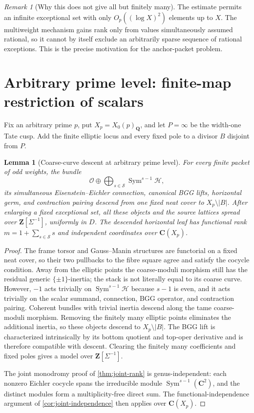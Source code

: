 \documentclass[11pt]{article}
\newtheorem{lemma}[lemma]{Lemma}
\theoremstyle{definition}
\theoremstyle{remark}
\newtheorem{remark}[remark]{Remark}
\newcommand{\Q}{\mathbf Q}
\newcommand{\Z}{\mathbf Z}
\newcommand{\C}{\mathbf C}
\newcommand{\Sym}{\operatorname{Sym}}
\newcommand{\calH}{\mathcal H}
\newcommand{\calO}{\mathcal O}
\begin{document}
\begin{remark}[Why this does not give all but finitely many]\label{rem:not-cofinite}
The estimate permits an infinite exceptional set with only
$O_p((\log X)^2)$ elements up to $X$.  The multiweight mechanism gains rank
only from values simultaneously assumed rational, so it cannot by itself
exclude an arbitrarily sparse sequence of rational exceptions.  This is the
precise motivation for the anchor-packet problem.
\end{remark}



\section{Arbitrary prime level: finite-map restriction of scalars}
\label{sec:curve-zero}

Fix an arbitrary prime $p$, put $X_p=X_0(p)_{\Q}$, and let $P=\infty$ be
the width-one Tate cusp.  Add the finite elliptic locus and every fixed pole
to a divisor $B$ disjoint from $P$.

\begin{lemma}[Coarse-curve descent at arbitrary prime level]
\label{lem:allprime-descent}
For every finite packet of odd weights, the bundle
\[
 \calO\oplus\bigoplus_{s\in\mathcal S}\Sym^{s-1}\calH,
\]
its simultaneous Eisenstein--Eichler connection, canonical BGG lifts,
horizontal germ, and contraction pairing descend from one fixed neat cover
to $X_p\setminus|B|$.  After enlarging a fixed exceptional set, all these
objects and the source lattices spread over $\Z[\Sigma^{-1}]$, uniformly in
$D$.  The descended horizontal leaf has functional rank
$m=1+\sum_{s\in\mathcal S}s$ and independent coordinates over
$\C(X_p)$.
\end{lemma}

\begin{proof}
The frame torsor and Gauss--Manin structures are functorial on a fixed neat
cover, so their two pullbacks to the fibre square agree and satisfy the cocycle
condition.  Away from the elliptic points the coarse-moduli morphism still has
the residual generic $\{\pm1\}$-inertia; the stack is not literally equal to
its coarse curve.  However, $-1$ acts trivially on
$\Sym^{s-1}\calH$ because $s-1$ is even, and it acts trivially on the scalar
summand, connection, BGG operator, and contraction pairing.  Coherent bundles
with trivial inertia descend along the tame coarse-moduli morphism.  Removing
the finitely many elliptic points eliminates the additional inertia, so these
objects descend to $X_p\setminus|B|$.  The BGG lift is characterized
intrinsically by its bottom quotient and top-oper derivative and is therefore
compatible with descent.  Clearing the finitely many coefficients and fixed
poles gives a model over $\Z[\Sigma^{-1}]$.

The joint monodromy proof of \cref{thm:joint-rank} is genus-independent: each
nonzero Eichler cocycle spans the irreducible module
$\Sym^{s-1}(\C^2)$, and the distinct modules form a multiplicity-free direct
sum.  The functional-independence argument of
\cref{cor:joint-independence} then applies over $\C(X_p)$.
\end{proof}
\end{document}
